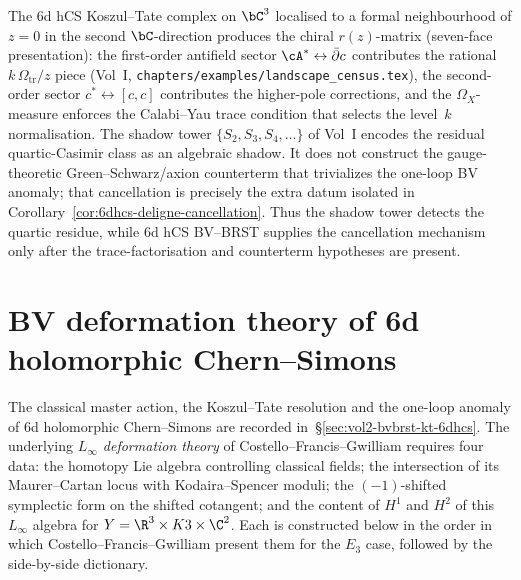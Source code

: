 \begin{remark}
\label{rem:6dhcs-rmatrix-shadow}
The 6d hCS Koszul--Tate complex on $\bC^3$ localised to a formal
neighbourhood of $z = 0$ in the second $\bC$-direction produces the
chiral $r(z)$-matrix (seven-face presentation): the
first-order antifield sector $\cA^* \leftrightarrow \bar\partial c$
contributes the rational $k\,\Omega_{\mathrm{tr}}/z$ piece
(Vol~I, \texttt{chapters/examples/landscape\_census.tex}), the
second-order sector $c^* \leftrightarrow [c,c]$ contributes the
higher-pole corrections, and the $\Omega_X$-measure enforces the
Calabi--Yau trace condition that selects the level~$k$ normalisation.
The shadow tower $\{S_2, S_3, S_4, \ldots\}$ of Vol~I encodes the
residual quartic-Casimir class as an algebraic shadow. It does not
construct the gauge-theoretic Green--Schwarz/axion counterterm that
trivializes the one-loop BV anomaly; that cancellation is precisely the
extra datum isolated in
Corollary~\ref{cor:6dhcs-deligne-cancellation}. Thus the shadow tower
detects the quartic residue, while 6d hCS BV--BRST supplies the
cancellation mechanism only after the trace-factorisation and
counterterm hypotheses are present.
\end{remark}

\section{BV deformation theory of 6d holomorphic Chern--Simons}
\label{sec:vol2-bvbrst-6dhcs-deformation}


The classical master action, the Koszul--Tate resolution and the
one-loop anomaly of 6d holomorphic Chern--Simons are
recorded in~\S\ref{sec:vol2-bvbrst-kt-6dhcs}. The underlying
\emph{$L_\infty$ deformation theory} of Costello--Francis--Gwilliam
\cite{CFG2026} requires four data: the homotopy Lie
algebra controlling classical fields; the intersection of its
Maurer--Cartan locus with Kodaira--Spencer moduli; the
$(-1)$-shifted symplectic form on the shifted cotangent; and the
content of $H^1$ and $H^2$ of this $L_\infty$ algebra for
$Y = \R^3\times K3\times\C^2$. Each is constructed below in the
order in which Costello--Francis--Gwilliam present them for the
$E_3$ case, followed by the side-by-side dictionary.

